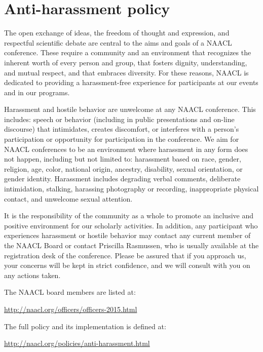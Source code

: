 \chapter[Anti-harassment policy]{Anti-harassment policy}
\thispagestyle{emptyheader}
\setheaders{}{}

The open exchange of ideas, the freedom of thought and expression, and
respectful scientific debate are central to the aims and goals of a
NAACL conference. These require a community and an environment that
recognizes the inherent worth of every person and group, that fosters
dignity, understanding, and mutual respect, and that embraces
diversity. For these reasons, NAACL is dedicated to providing a
harassment-free experience for participants at our events and in our
programs. 

Harassment and hostile behavior are unwelcome at any NAACL
conference. This includes: speech or behavior (including in public
presentations and on-line discourse) that intimidates, creates
discomfort, or interferes with a person’s participation or opportunity
for participation in the conference. We aim for NAACL conferences to
be an environment where harassment in any form does not happen,
including but not limited to: harassment based on race, gender,
religion, age, color, national origin, ancestry, disability, sexual
orientation, or gender identity. Harassment includes degrading verbal
comments, deliberate intimidation, stalking, harassing photography or
recording, inappropriate physical contact, and unwelcome sexual
attention. 

It is the responsibility of the community as a whole to promote an
inclusive and positive environment for our scholarly activities. In
addition, any participant who experiences harassment or hostile
behavior may contact any current member of the NAACL Board or contact
Priscilla Rasmussen, who is usually available at the registration desk
of the conference. Please be assured that if you approach us, your
concerns will be kept in strict confidence, and we will consult with
you on any actions taken. 

The NAACL board members are listed at:

\url{http://naacl.org/officers/officers-2015.html}

The full policy and its implementation is defined at:

\url{http://naacl.org/policies/anti-harassment.html}
